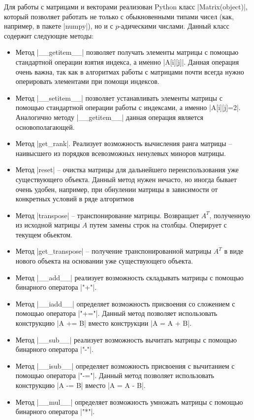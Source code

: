 \documentclass[master, och, diploma, times]{sty/SCWorks}
\theoremstyle{plain}
\theoremstyle{definition}
\numberwithin{equation}{section}
\begin{document}
Для работы с матрицами и векторами реализован Python класс |Matrix(object)|, который позволяет работать не только с обыкновенными типами чисел (как, например, в пакете |numpy|), но и с $p$-адическими числами. Данный класс содержит следующие методы:

\begin{itemize}
\item Метод |__getitem__| позволяет получать элементы матрицы с помощью стандартной операции взятия индекса, а именно |A[i][j]|. Данная операция очень важна, так как в алгоритмах работы с матрицами почти всегда нужно оперировать элементами при помощи индексов.
\item Метод |__setitem__| позволяет устанавливать элементы матрицы с помощью стандартной операции работы с индексами, а именно |A[i][j]=2|. Аналогично методу |__getitem__| данная операция является основополагающей.
\item Метод |get_rank|. Реализует возможность вычисления ранга матрицы -- наивысшего из порядков всевозможных ненулевых миноров матрицы.
\item Метод |reset| -- очистка матрицы для дальнейшего переиспользования уже существующего объекта. Данный метод нужен нечасто, но иногда бывает очень удобен, например, при обнулении матрицы в зависимости от конкретных условий в ряде алгоритмов
\item Метод |transpose| -- транспонирование матрицы. Возвращает $A^{T}$, полученную из исходной матрицы $A$ путем замены строк на столбцы. Оперирует с текущем обьектом.
\item Метод |get_transpose| -- получение транспонированной матрицы $A^{T}$ в виде нового объекта на основании уже существующего объекта.
\item Метод |__add__| реализует возможность складывать матрицы с помощью бинарного оператора |"+"|.
\item Метод |__iadd__| определяет возможность присвоения со сложением с помощью оператора |"+="|. Данный метод позволяет использовать конструкцию |A += B| вместо конструкции |A = A + B|.
\item Метод |__sub__| реализует возможность вычитать матрицы с помощью бинарного оператора |"-"|.
\item Метод |__isub__| определяет возможность присвоения с вычитанием с помощью оператора |"-="|. Данный метод позволяет использовать конструкцию |A -= B| вместо |A = A - B|.
\item Метод |__mul__| определяет возможность умножать матрицы с помощью бинарного оператора |"*"|.

\end{itemize}
\end{document}
